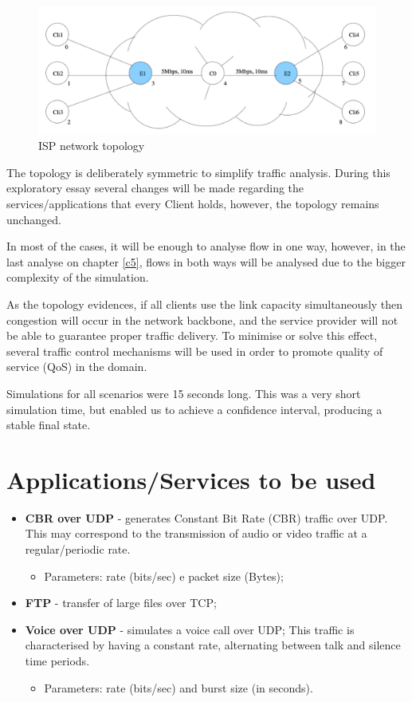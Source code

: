 \documentclass[conference,compsoc]{IEEEtran}
\begin{document}
    \begin{figure}[H]
    \centering
    \includegraphics[width=1\columnwidth]{PNG/network.png}
    \caption{ISP network topology}
    \label{fig:network}
    \end{figure}
    
    The topology is deliberately symmetric to simplify traffic analysis.
    During this exploratory essay several changes will be made regarding the services/applications that every Client holds, however, the topology remains unchanged. \par 
    In most of the cases, it will be enough to analyse flow in one way, however, in the last analyse on chapter \ref{c5}, flows in both ways will be analysed due to the bigger complexity of the simulation.\par 
    As the topology evidences, if all clients use the link capacity simultaneously then congestion will occur in the network backbone, and the service provider will not be able to guarantee proper traffic delivery. To minimise or solve this effect, several traffic control mechanisms will be used in order to promote quality of service (QoS) in the domain.\par 
    Simulations for all scenarios were 15 seconds long. This was a very short simulation time, but enabled us to achieve a confidence interval, producing a stable final state.
    
    \section{Applications/Services to be used}
    
    \begin{itemize}
        \item \textbf{CBR over UDP} - generates Constant Bit Rate (CBR) traffic over UDP. This may correspond to
    the transmission of audio or video traffic at a regular/periodic rate.
    \begin{itemize}
        \item Parameters: rate (bits/sec) e packet size (Bytes);
    \end{itemize}
        \item \textbf{FTP} - transfer of large files over TCP;
        \item \textbf{Voice over UDP} - simulates a voice call over UDP; This traffic is characterised by having a constant
    rate, alternating between talk and silence time periods.
    \begin{itemize}
        \item Parameters: rate (bits/sec) and burst size (in seconds).
    \end{itemize}
    \end{itemize}
    
\end{document}
